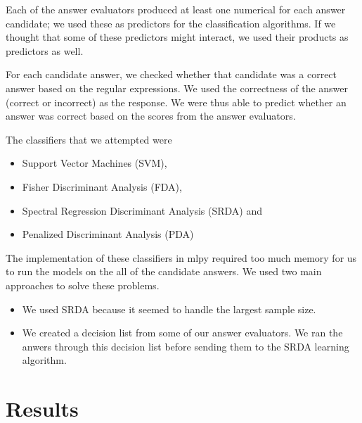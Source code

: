 \documentclass{article}
\begin{document}
Each of the answer evaluators produced at least one numerical for each answer
candidate; we used these as predictors for the classification algorithms.
If we thought that some of these predictors might interact, we used their products
as predictors as well.

For each candidate answer, we checked whether that candidate was a correct answer based on
the regular expressions. We used the correctness of the answer (correct or incorrect)
as the response. We were thus able to predict whether an answer was correct
based on the scores from the answer evaluators.

The classifiers that we attempted were
\begin{itemize}
\item Support Vector Machines (SVM),
\item Fisher Discriminant Analysis (FDA),
\item Spectral Regression Discriminant Analysis (SRDA) and
\item Penalized Discriminant Analysis (PDA)
\end{itemize}
The implementation of these classifiers in mlpy required too much memory for
us to run the models on the all of the candidate answers. We used two main approaches
to solve these problems.
\begin{itemize}
\item We used SRDA because it seemed to handle the largest sample size.
\item We created a decision list from some of our answer evaluators. We ran the anwers
through this decision list before sending them to the SRDA learning algorithm.
\end{itemize}

\section{Results}

\end{document}
